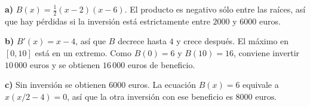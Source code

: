 \textbf{a)} $B(x)=\tfrac12(x-2)(x-6)$. El producto es negativo sólo entre las raíces, así que hay pérdidas si la inversión está estrictamente entre $2000$ y $6000$ euros.

\textbf{b)} $B'(x)=x-4$, así que $B$ decrece hasta $4$ y crece después. El máximo en $[0,10]$ está en un extremo. Como $B(0)=6$ y $B(10)=16$, conviene invertir $\boxed{10\,000\text{ euros}}$ y se obtienen $16\,000$ euros de beneficio.

\textbf{c)} Sin inversión se obtienen $6000$ euros. La ecuación $B(x)=6$ equivale a $x(x/2-4)=0$, así que la otra inversión con ese beneficio es $\boxed{8000\text{ euros}}$.
